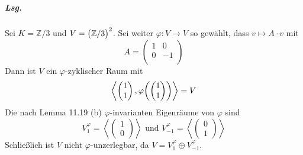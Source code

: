 \documentclass{scrreprt}
\begin{document}
\subparagraph{Lsg.} Sei $K = \mathbb{Z}/3$ und $V = \qty\big(\mathbb{Z}/3)^2$.
Sei weiter $\varphi \colon V \to V$ so gewählt, dass $v \mapsto A \cdot v$ mit
\[
  A = \begin{pmatrix}
    1 & 0 \\
    0 & -1 \\
  \end{pmatrix}
\]
Dann ist $V$ ein $\varphi$-zyklischer Raum mit
\[
  \left\langle
    \begin{pmatrix}1\\1\end{pmatrix},
    \varphi\qty(\begin{pmatrix}1\\1\end{pmatrix})
  \right\rangle = V
\]
Die nach Lemma 11.19 (b) $\varphi$-invarianten Eigenräume von $\varphi$ sind
\[
  V_1^{\varphi} = \left\langle
    \begin{pmatrix}1\\0\end{pmatrix}
  \right\rangle \text{ und } V_{-1}^{\varphi} = \left\langle
    \begin{pmatrix}0\\1\end{pmatrix}
  \right\rangle
\]
Schließlich ist $V$ nicht $\varphi$-unzerlegbar, da
$V = V_1^{\varphi} \oplus V_{-1}^{\varphi}$.
\end{document}

